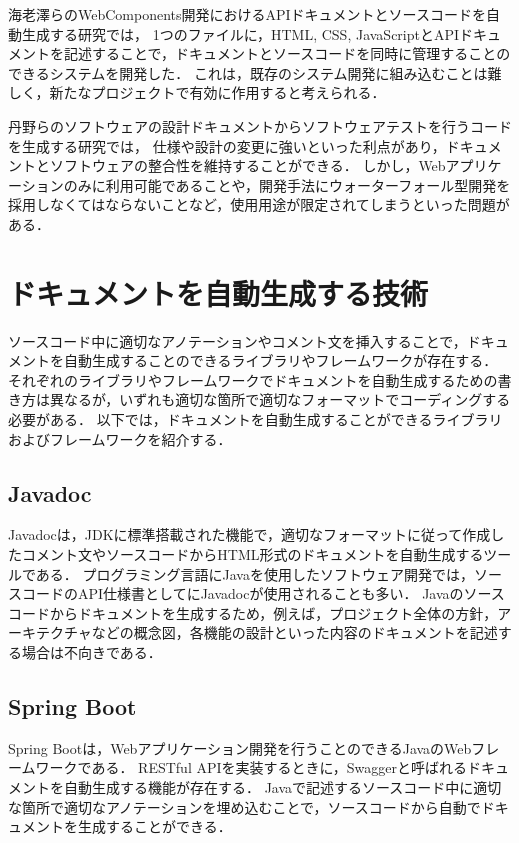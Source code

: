 海老澤らのWebComponents開発におけるAPIドキュメントとソースコードを自動生成する研究\cite{webcomponents}では，
1つのファイルに，HTML, CSS, JavaScriptとAPIドキュメントを記述することで，ドキュメントとソースコードを同時に管理することのできるシステムを開発した．
これは，既存のシステム開発に組み込むことは難しく，新たなプロジェクトで有効に作用すると考えられる．

丹野らのソフトウェアの設計ドキュメントからソフトウェアテストを行うコードを生成する研究\cite{test}では，
仕様や設計の変更に強いといった利点があり，ドキュメントとソフトウェアの整合性を維持することができる．
しかし，Webアプリケーションのみに利用可能であることや，開発手法にウォーターフォール型開発を採用しなくてはならないことなど，使用用途が限定されてしまうといった問題がある．

\section{ドキュメントを自動生成する技術}
ソースコード中に適切なアノテーションやコメント文を挿入することで，ドキュメントを自動生成することのできるライブラリやフレームワークが存在する．
それぞれのライブラリやフレームワークでドキュメントを自動生成するための書き方は異なるが，いずれも適切な箇所で適切なフォーマットでコーディングする必要がある．
以下では，ドキュメントを自動生成することができるライブラリおよびフレームワークを紹介する．

\subsection{Javadoc}
Javadoc\cite{javadoc}は，JDKに標準搭載された機能で，適切なフォーマットに従って作成したコメント文やソースコードからHTML形式のドキュメントを自動生成するツールである．
プログラミング言語にJavaを使用したソフトウェア開発では，ソースコードのAPI仕様書としてにJavadocが使用されることも多い．
Javaのソースコードからドキュメントを生成するため，例えば，プロジェクト全体の方針，アーキテクチャなどの概念図，各機能の設計といった内容のドキュメントを記述する場合は不向きである．

\subsection{Spring Boot}
Spring Boot\cite{spring}は，Webアプリケーション開発を行うことのできるJavaのWebフレームワークである．
RESTful APIを実装するときに，Swagger\cite{swagger}と呼ばれるドキュメントを自動生成する機能が存在する．
Javaで記述するソースコード中に適切な箇所で適切なアノテーションを埋め込むことで，ソースコードから自動でドキュメントを生成することができる．

